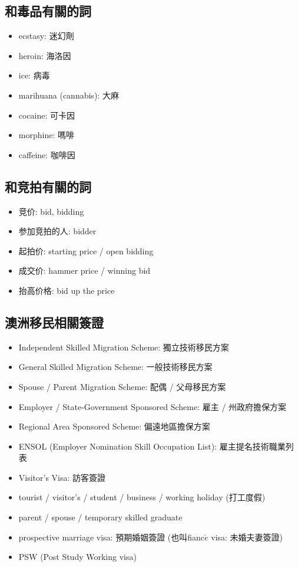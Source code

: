 \subsection{和毒品有關的詞}
\begin{multicols}{2}
\begin{itemize}
  \itemsep0em
  \item ecstasy: 迷幻劑
  \item heroin: 海洛因
  \item ice: 病毒
  \item marihuana (cannabis): 大麻
  \item cocaine: 可卡因
  \item morphine: 嗎啡
  \item caffeine: 咖啡因
\end{itemize}
\end{multicols}

\subsection{和竞拍有關的詞}
\begin{multicols}{2}
\begin{itemize}
  \itemsep0em
  \item 竞价: bid, bidding
  \item 参加竞拍的人: bidder
  \item 起拍价: starting price / open bidding
  \item 成交价: hammer price / winning bid
  \item 抬高价格: bid up the price
\end{itemize}
\end{multicols}

\subsection{澳洲移民相關簽證}
\begin{itemize}
  \itemsep0em
  \item Independent Skilled Migration Scheme: 獨立技術移民方案
  \item General Skilled Migration Scheme: 一般技術移民方案
  \item Spouse / Parent Migration Scheme: 配偶 / 父母移民方案
  \item Employer / State-Government Sponsored Scheme: 雇主 / 州政府擔保方案
  \item Regional Area Sponsored Scheme: 偏遠地區擔保方案
  \item ENSOL (Employer Nomination Skill Occupation List): 雇主提名技術職業列表
  \item Visitor's Visa: 訪客簽證
  \item tourist / visitor's / student / business / working holiday (打工度假)
  \item parent / spouse / temporary skilled graduate
  \item prospective marriage visa: 預期婚姻簽證 (也叫fianc$\acute{e}$ visa: 未婚夫妻簽證)
  \item PSW (Post Study Working visa)
\end{itemize}

